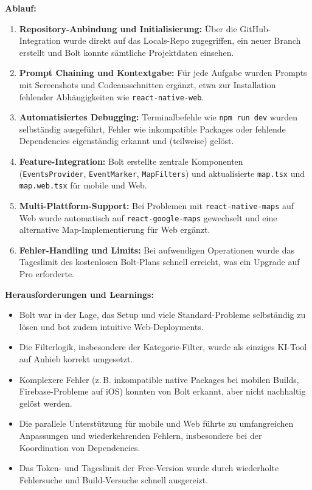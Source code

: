 \textbf{Ablauf:}
\begin{enumerate}
      \item \textbf{Repository-Anbindung und Initialisierung:} Über die GitHub-Integration wurde direkt auf das Locals-Repo zugegriffen, ein neuer Branch erstellt und Bolt konnte sämtliche Projektdaten einsehen.
      \item \textbf{Prompt Chaining und Kontextgabe:} Für jede Aufgabe wurden Prompts mit Screenshots und Codeausschnitten ergänzt, etwa zur Installation fehlender Abhängigkeiten wie \texttt{react-native-web}.
      \item \textbf{Automatisiertes Debugging:} Terminalbefehle wie \texttt{npm run dev} wurden selbständig ausgeführt, Fehler wie inkompatible Packages oder fehlende Dependencies eigenständig erkannt und (teilweise) gelöst.
      \item \textbf{Feature-Integration:} Bolt erstellte zentrale Komponenten (\texttt{EventsProvider}, \texttt{EventMarker}, \texttt{MapFilters}) und aktualisierte \texttt{map.tsx} und \texttt{map.web.tsx} für mobile und Web.
      \item \textbf{Multi-Plattform-Support:} Bei Problemen mit \texttt{react-native-maps} auf Web wurde automatisch auf \texttt{react-google-maps} gewechselt und eine alternative Map-Implementierung für Web ergänzt.
      \item \textbf{Fehler-Handling und Limits:} Bei aufwendigen Operationen wurde das Tageslimit des kostenlosen Bolt-Plans schnell erreicht, was ein Upgrade auf Pro erforderte.
\end{enumerate}

\textbf{Herausforderungen und Learnings:}
\begin{itemize}
      \item Bolt war in der Lage, das Setup und viele Standard-Probleme selbständig zu
            lösen und bot zudem intuitive Web-Deployments.
      \item Die Filterlogik, insbesondere der Kategorie-Filter, wurde als einziges KI-Tool
            auf Anhieb korrekt umgesetzt.
      \item Komplexere Fehler (z.\,B. inkompatible native Packages bei mobilen Builds,
            Firebase-Probleme auf iOS) konnten von Bolt erkannt, aber nicht nachhaltig
            gelöst werden.
      \item Die parallele Unterstützung für mobile und Web führte zu umfangreichen
            Anpassungen und wiederkehrenden Fehlern, insbesondere bei der Koordination von
            Dependencies.
      \item Das Token- und Tageslimit der Free-Version wurde durch wiederholte Fehlersuche
            und Build-Versuche schnell ausgereizt.
\end{itemize}

